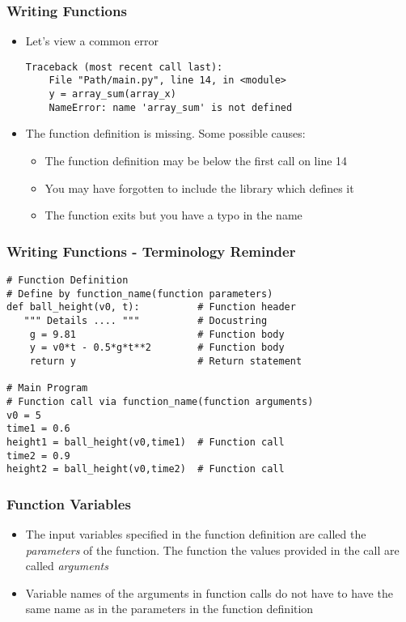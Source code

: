 \documentclass[english,14pt]{beamer}
\begin{document}
\begin{frame}[fragile]
\frametitle{Writing Functions}
\begin{itemize}
    \item Let's view a common error
    \begin{lstlisting}[style=pseudo]
    Traceback (most recent call last):
    File "Path/main.py", line 14, in <module>
    y = array_sum(array_x)
    NameError: name 'array_sum' is not defined
    \end{lstlisting}
    \item The function definition is missing. Some possible causes:
    \begin{itemize}
        \item The function definition may be below the first call on line 14
        \item You may have forgotten to include the library which defines it
        \item The function exits but you have a typo in the name 
    \end{itemize}
\end{itemize}
\end{frame}


\begin{frame}[fragile]
\frametitle{Writing Functions - Terminology Reminder}
\begin{lstlisting}[style=CStyle]
# Function Definition 
# Define by function_name(function parameters)  
def ball_height(v0, t):          # Function header
   """ Details .... """          # Docustring
    g = 9.81                     # Function body
    y = v0*t - 0.5*g*t**2        # Function body
    return y                     # Return statement
    
# Main Program
# Function call via function_name(function arguments)
v0 = 5                        
time1 = 0.6                       
height1 = ball_height(v0,time1)  # Function call  
time2 = 0.9
height2 = ball_height(v0,time2)  # Function call  
\end{lstlisting}
\end{frame}

\begin{frame}[fragile]
\frametitle{Function Variables}
\begin{itemize}
    \item The input variables specified in the function definition are called the \textit{parameters} of the function. The function the values provided in the call are called \textit{arguments}
    \item Variable names of the arguments in function calls do not have to have the same name as in the parameters in the function definition 
\end{itemize}
\end{frame}
\end{document}
